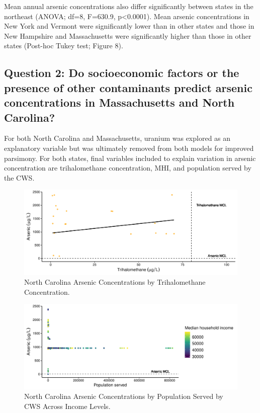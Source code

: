 \documentclass[12pt,]{article}
\begin{document}
Mean annual arsenic concentrations also differ significantly between
states in the northeast (ANOVA; df=8, F=630.9, p\textless{}0.0001). Mean
arsenic concentrations in New York and Vermont were significantly lower
than in other states and those in New Hampshire and Massachusetts were
significantly higher than those in other states (Post-hoc Tukey test;
Figure 8).

\newpage

\hypertarget{question-2-do-socioeconomic-factors-or-the-presence-of-other-contaminants-predict-arsenic-concentrations-in-massachusetts-and-north-carolina}{%
\subsection{Question 2: Do socioeconomic factors or the presence of
other contaminants predict arsenic concentrations in Massachusetts and
North
Carolina?}\label{question-2-do-socioeconomic-factors-or-the-presence-of-other-contaminants-predict-arsenic-concentrations-in-massachusetts-and-north-carolina}}

For both North Carolina and Massachusetts, uranium was explored as an
explanatory variable but was ultimately removed from both models for
improved parsimony. For both states, final variables included to explain
variation in arsenic concentration are trihalomethane concentration,
MHI, and population served by the CWS.

\begin{figure}
\centering
\includegraphics{Project_Template_files/figure-latex/figs9-1.pdf}
\caption{North Carolina Arsenic Concentrations by Trihalomethane
Concentration.}
\end{figure}

\begin{figure}
\centering
\includegraphics{Project_Template_files/figure-latex/figs10-1.pdf}
\caption{North Carolina Arsenic Concentrations by Population Served by
CWS Across Income Levels.}
\end{figure}
\end{document}

